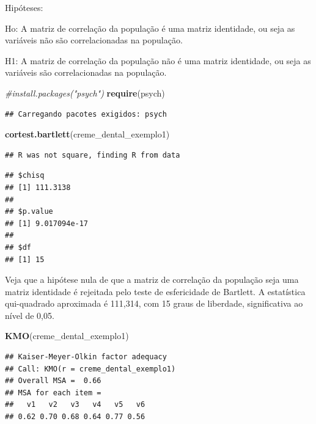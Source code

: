 \documentclass[12pt,brazil,]{book}
\newenvironment{Shaded}{\begin{snugshade}}{\end{snugshade}}
\newcommand{\CommentTok}[1]{\textcolor[rgb]{0.56,0.35,0.01}{\textit{#1}}}
\newcommand{\KeywordTok}[1]{\textcolor[rgb]{0.13,0.29,0.53}{\textbf{#1}}}
\newcommand{\NormalTok}[1]{#1}
\begin{document}
Hipóteses:

Ho: A matriz de correlação da população é uma matriz identidade, ou seja
as variáveis não são correlacionadas na população.

H1: A matriz de correlação da população não é uma matriz identidade, ou
seja as variáveis são correlacionadas na população.

\begin{Shaded}
\begin{Highlighting}[]
\CommentTok{#install.packages("psych")}
\KeywordTok{require}\NormalTok{(psych)}
\end{Highlighting}
\end{Shaded}

\begin{verbatim}
## Carregando pacotes exigidos: psych
\end{verbatim}

\begin{Shaded}
\begin{Highlighting}[]
\KeywordTok{cortest.bartlett}\NormalTok{(creme_dental_exemplo1)}
\end{Highlighting}
\end{Shaded}

\begin{verbatim}
## R was not square, finding R from data
\end{verbatim}

\begin{verbatim}
## $chisq
## [1] 111.3138
## 
## $p.value
## [1] 9.017094e-17
## 
## $df
## [1] 15
\end{verbatim}

Veja que a hipótese nula de que a matriz de correlação da população seja
uma matriz identidade é rejeitada pelo teste de esfericidade de
Bartlett. A estatística qui-quadrado aproximada é 111,314, com 15 graus
de liberdade, significativa ao nível de 0,05.

\begin{Shaded}
\begin{Highlighting}[]
\KeywordTok{KMO}\NormalTok{(creme_dental_exemplo1)}
\end{Highlighting}
\end{Shaded}

\begin{verbatim}
## Kaiser-Meyer-Olkin factor adequacy
## Call: KMO(r = creme_dental_exemplo1)
## Overall MSA =  0.66
## MSA for each item = 
##   v1   v2   v3   v4   v5   v6 
## 0.62 0.70 0.68 0.64 0.77 0.56
\end{verbatim}
\end{document}
